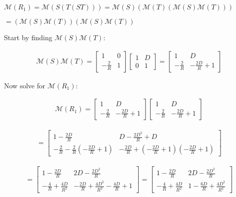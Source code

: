 \documentclass[fleqn]{article}
\begin{document}
\begin{enumerate}[nolistsep]
			$\mathcal{M}(R_1) = \mathcal{M}(S(T(ST))) = \mathcal{M}(S)(\mathcal{M}(T)(\mathcal{M}(S)\mathcal{M}(T)))$
			
			$ = (\mathcal{M}(S)\mathcal{M}(T))(\mathcal{M}(S)\mathcal{M}(T))$
			
			Start by finding $\mathcal{M}(S)\mathcal{M}(T)$:
			
			\begin{align*}
				\mathcal{M}(S)\mathcal{M}(T) = \begin{bmatrix} 1 & 0\\ -\frac{2}{R} & 1 \end{bmatrix} \begin{bmatrix}1 & D\\ 0 & 1\end{bmatrix} = \begin{bmatrix}1 & D\\ -\frac{2}{R} & -\frac{2D}{R} + 1\end{bmatrix}
			\end{align*}
			
			Now solve for $\mathcal{M}(R_1)$:
			
			\begin{align*}
				\mathcal{M}(R_1) = \begin{bmatrix}1 & D\\ -\frac{2}{R} & -\frac{2D}{R} + 1\end{bmatrix}\begin{bmatrix}1 & D\\ -\frac{2}{R} & -\frac{2D}{R} + 1\end{bmatrix}
			\end{align*}
			
			\begin{align*}
				= \begin{bmatrix}1 - \frac{2D}{R} & D - \frac{2D^2}{R} + D\\ -\frac{2}{R} - \frac{2}{R}(-\frac{2D}{R} + 1) & -\frac{2D}{R} + (-\frac{2D}{R}+1)(-\frac{2D}{R}+1)\end{bmatrix}
			\end{align*}
			
			\begin{align*}
				= \begin{bmatrix}1 - \frac{2D}{R} & 2D - \frac{2D^2}{R}\\ -\frac{4}{R} +\frac{4D}{R^2} & -\frac{2D}{R} + \frac{4D^2}{R^2} -\frac{4D}{R} + 1\end{bmatrix} = \begin{bmatrix}1 - \frac{2D}{R} & 2D - \frac{2D^2}{R}\\ -\frac{4}{R} + \frac{4D}{R^2} & 1 - \frac{6D}{R} + \frac{4D^2}{R^2}\end{bmatrix}
			\end{align*}
			

\end{enumerate}
\end{document}

